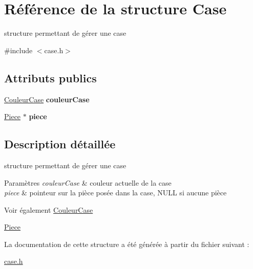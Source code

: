 \hypertarget{struct_case}{\section{Référence de la structure Case}
\label{struct_case}
}


structure permettant de gérer une case  




{\ttfamily \#include $<$case.\-h$>$}

\subsection*{Attributs publics}
\begin{DoxyCompactItemize}
\item 
\hypertarget{struct_case_a789119e105e311f24a2bb9199b6a2551}{\hyperlink{struct_couleur_case}{Couleur\-Case} {\bfseries couleur\-Case}}\label{struct_case_a789119e105e311f24a2bb9199b6a2551}

\item 
\hypertarget{struct_case_aecf7c05bfb4eaf8332f9c556319993a3}{\hyperlink{struct_piece}{Piece} $\ast$ {\bfseries piece}}\label{struct_case_aecf7c05bfb4eaf8332f9c556319993a3}

\end{DoxyCompactItemize}


\subsection{Description détaillée}
structure permettant de gérer une case 


\begin{DoxyParams}{Paramètres}
{\em couleur\-Case} & couleur actuelle de la case \\
\hline
{\em piece} & pointeur sur la pièce posée dans la case, N\-U\-L\-L si aucune pièce \\
\hline
\end{DoxyParams}
\begin{DoxySeeAlso}{Voir également}
\hyperlink{struct_couleur_case}{Couleur\-Case} 

\hyperlink{struct_piece}{Piece} 
\end{DoxySeeAlso}


La documentation de cette structure a été générée à partir du fichier suivant \-:\begin{DoxyCompactItemize}
\item 
\hyperlink{case_8h}{case.\-h}\end{DoxyCompactItemize}
